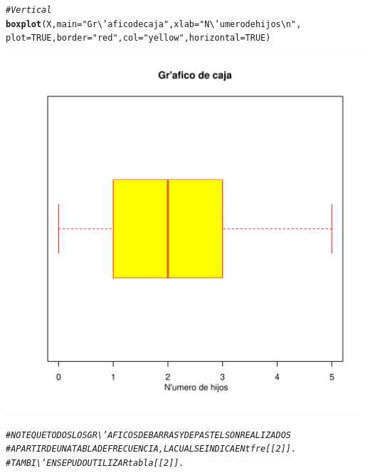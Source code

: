 \documentclass[12pt,letterpaper]{article}\usepackage[]{graphicx}\usepackage[]{color}
\makeatletter
\def\maxwidth{ %
  \ifdim\Gin@nat@width>\linewidth
    \linewidth
  \else
    \Gin@nat@width
  \fi
}
\newcommand{\hlnum}[1]{\textcolor[rgb]{0.686,0.059,0.569}{#1}}%
\newcommand{\hlstr}[1]{\textcolor[rgb]{0.192,0.494,0.8}{#1}}%
\newcommand{\hlcom}[1]{\textcolor[rgb]{0.678,0.584,0.686}{\textit{#1}}}%
\newcommand{\hlstd}[1]{\textcolor[rgb]{0.345,0.345,0.345}{#1}}%
\newcommand{\hlkwc}[1]{\textcolor[rgb]{0.333,0.667,0.333}{#1}}%
\newcommand{\hlkwd}[1]{\textcolor[rgb]{0.737,0.353,0.396}{\textbf{#1}}}%
\newenvironment{kframe}{%
 \def\at@end@of@kframe{}%
 \ifinner\ifhmode%
  \def\at@end@of@kframe{\end{minipage}}%
  \begin{minipage}{\columnwidth}%
 \fi\fi%
 \def\FrameCommand##1{\hskip\@totalleftmargin \hskip-\fboxsep
 \colorbox{shadecolor}{##1}\hskip-\fboxsep
     \hskip-\linewidth \hskip-\@totalleftmargin \hskip\columnwidth}%
 \MakeFramed {\advance\hsize-\width
   \@totalleftmargin\z@ \linewidth\hsize
   \@setminipage}}%
 {\par\unskip\endMakeFramed%
 \at@end@of@kframe}
\newenvironment{knitrout}{}{} %
\makeatother
\begin{document}
\begin {itemize}
\begin{knitrout}
\begin{kframe}\begin{alltt}
\hlcom{# Vertical}
\hlkwd{boxplot}\hlstd{(X,} \hlkwc{main}\hlstd{=}\hlstr{"Gr\textbackslash{}'afico de caja"}\hlstd{,} \hlkwc{xlab}\hlstd{=}\hlstr{" N\textbackslash{}'umero de hijos\textbackslash{}n"}\hlstd{,}
        \hlkwc{plot}\hlstd{=}\hlnum{TRUE}\hlstd{,} \hlkwc{border}\hlstd{=}\hlstr{"red"}\hlstd{,}\hlkwc{col}\hlstd{=}\hlstr{"yellow"}\hlstd{,} \hlkwc{horizontal}\hlstd{=}\hlnum{TRUE}\hlstd{)}
\end{alltt}
\end{kframe}
\includegraphics[width=\maxwidth]{figure/unnamed-chunk-9-5} 
\begin{kframe}\begin{alltt}
\hlcom{# NOTE QUE TODOS LOS GR\textbackslash{}'AFICOS DE BARRAS Y DE PASTEL SON REALIZADOS}
\hlcom{# APARTIR DE UNA TABLA DE FRECUENCIA, LA CUAL SE INDICA EN tfre[[2]].}
\hlcom{# TAMBI\textbackslash{}'EN SE PUDO UTILIZAR tabla[[2]].}
\end{alltt}
\end{kframe}
\end{knitrout}
\end{itemize}
\end{document}

